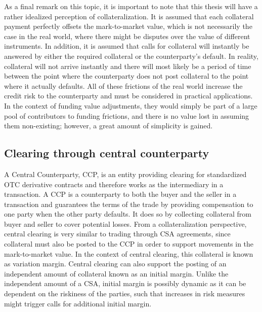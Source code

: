 \documentclass[main.tex]{subfiles}
\begin{document}
        As a final remark on this topic,
        it is important to note that this thesis will have a rather idealized perception of collateralization.
        It is assumed that each collateral payment perfectly offsets the mark-to-market value,
        which is not necessarily the case in the real world,
        where there might be disputes over the value of different instruments.
        In addition, it is assumed that calls for collateral will instantly be answered
        by either the required collateral or the counterparty's default. 
        In reality, collateral will not arrive instantly and there will most likely be a period of time between
        the point where the counterparty does not post collateral to the point where it actually defaults.
        All of these frictions of the real world increase the credit risk to the counterparty
        and must be considered in practical applications. 
        In the context of funding value adjustments, 
        they would simply be part of a large pool of contributors to funding frictions,
        and there is no value lost in assuming them non-existing;
        however, a great amount of simplicity is gained.

    \subsection{Clearing through central counterparty}
        A Central Counterparty, CCP, is an entity 
        providing clearing for standardized OTC derivative contracts
        and therefore works as the intermediary in a transaction.
        A CCP is a counterparty to both the buyer and the seller in a transaction 
        and guarantees the terms of the trade by providing compensation to one party when the other party defaults.
        It does so by collecting collateral from buyer and seller to cover potential losses.
        From a collateralization perspective, central clearing is very similar to trading through CSA agreements,
        since collateral must also be posted to the CCP in order to support movements in the mark-to-market value.
        In the context of central clearing, this collateral is known as variation margin.
        Central clearing can also support the posting of an independent amount of collateral 
        known as an initial margin.
        Unlike the independent amount of a CSA, initial margin is possibly dynamic 
        as it can be dependent on the riskiness of the parties, 
        such that increases in risk measures might trigger calls for additional initial margin.
\end{document}
